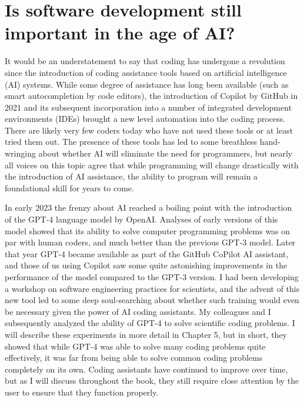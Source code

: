 \section{Is software development still important in the age of AI?}

It would be an understatement to say that coding has undergone a revolution since the introduction of coding assistance tools based on artificial intelligence (AI) systems.
While some degree of assistance has long been available (such as smart autocompletion by code editors), the introduction of Copilot by GitHub in 2021 and its subsequent incorporation into a number of integrated development environments (IDEs) brought a new level automation into the coding process.
There are likely very few coders today who have not used these tools or at least tried them out.
The presence of these tools has led to some breathless hand-wringing about whether AI will eliminate the need for programmers, but nearly all voices on this topic agree that while programming will change drastically with the introduction of AI assistance, the ability to program will remain a foundational skill for years to come.

In early 2023 the frenzy about AI reached a boiling point with the introduction of the GPT-4 language model by OpenAI.
Analyses of early versions of this model \citep{Bubeck:2023aa} showed that its ability to solve computer programming problems was on par with human coders, and much better than the previous GPT-3 model.
Later that year GPT-4 became available as part of the GitHub CoPilot AI assistant, and those of us using Copilot saw some quite astonishing improvements in the performance of the model compared to the GPT-3 version.
I had been developing a workshop on software engineering practices for scientists, and the advent of this new tool led to some deep soul-searching about whether such training would even be necessary given the power of AI coding assistants.
My colleagues and I \citep{Poldrack:2023aa} subsequently analyzed the ability of GPT-4 to solve scientific coding problems.
I will describe these experiments in more detail in Chapter 5, but in short, they showed that while GPT-4 was able to solve many coding problems quite effectively, it was far from being able to solve common coding problems completely on its own.  Coding assistants have continued to improve over time, but as I will discuss throughout the book, they still require close attention by the user to ensure that they function properly.

